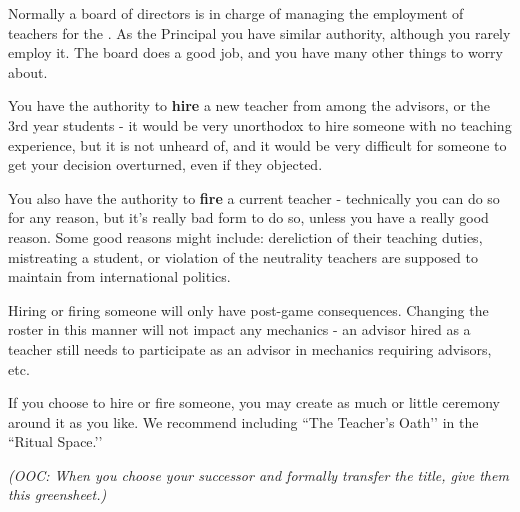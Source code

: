 \documentclass[green]{GL2020}
\begin{document}
\name{\gHireTeacher{}}

Normally a board of directors is in charge of managing the employment of teachers for the \pSchool{}. As the Principal you have similar authority, although you rarely employ it. The board does a good job, and you have many other things to worry about.

You have the authority to \textbf{hire} a new teacher from among the advisors, or the 3rd year students - it would be very unorthodox to hire someone with no teaching experience, but it is not unheard of, and it would be very difficult for someone to get your decision overturned, even if they objected.

You also have the authority to \textbf{fire} a current teacher - technically you can do so for any reason, but it’s really bad form to do so, unless you have a really good reason. Some good reasons might include: dereliction of their teaching duties, mistreating a student, or violation of the neutrality teachers are supposed to maintain from international politics.

Hiring or firing someone will only have post-game consequences. Changing the roster in this manner will not impact any mechanics - an advisor hired as a teacher still needs to participate as an advisor in mechanics requiring advisors, etc.

If you choose to hire or fire someone, you may create as much or little ceremony around it as you like. We recommend including ``The Teacher’s Oath’’ in the ``Ritual Space.’’

\emph{(OOC: When you choose your successor and formally transfer the title, give them this greensheet.)}
\end{document}
